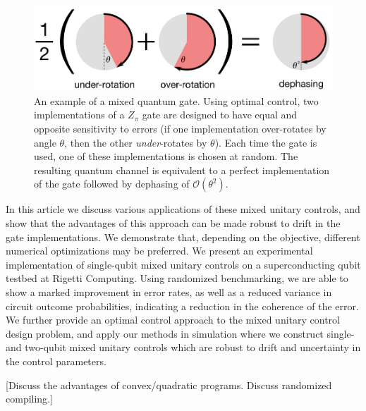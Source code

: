 \documentclass[aps,nofootinbib,pra,notitlepage,twocolumn]{revtex4-1}
\newcommand{\order}[1]{\mathcal{O}\left( #1 \right)}
\newcommand{\note}[1]{{\color{red}[#1]}}
\begin{document}
\begin{figure}[t]
  \centering
  \includegraphics[width=\columnwidth]{simple_example.pdf}
  \caption{An example of a mixed quantum gate. Using optimal control, two implementations of a $Z_\pi$ gate are designed to have equal and opposite sensitivity to errors (if one implementation over-rotates by angle $\theta$, then the other \emph{under}-rotates by $\theta$). Each time the gate is used, one of these implementations is chosen at random. The resulting quantum channel is equivalent to a perfect implementation of the gate followed by dephasing of $\order{\theta^2}$.}
  \label{fig:simple_example}
\end{figure}


In this article we discuss various applications of these mixed unitary controls, and show that the advantages of this approach can be made robust to drift in the gate implementations. We demonstrate that, depending on the objective, different numerical optimizations may be preferred. We present an experimental implementation of single-qubit mixed unitary controls on a superconducting qubit testbed at Rigetti Computing. Using randomized benchmarking, we are able to show a marked improvement in error rates, as well as a reduced variance in circuit outcome probabilities, indicating a reduction in the coherence of the error. We further provide an optimal control approach to the mixed unitary control design problem, and apply our methods in simulation where we construct single- and two-qubit mixed unitary controls which are robust to drift and uncertainty in the control parameters.   

\note{Discuss the advantages of convex/quadratic programs. Discuss randomized compiling.}

\end{document}
